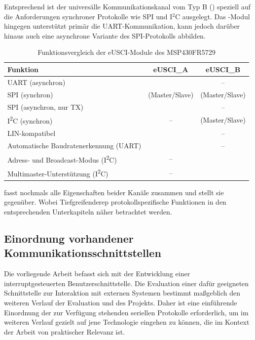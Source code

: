 \newpage
Entsprechend ist der univers\"alle Kommunikationskanal vom Typ B () speziell auf die Anforderungen synchroner Protokolle wie SPI und I$^{2}$C ausgelegt. Das -Modul hingegen unterst\"utzt prim\"ar die UART-Kommunikation, kann jedoch dar\"uber hinaus auch eine asynchrone Variante des SPI-Protokolls abbilden. 

\begin{table}[h!]
	\small
	\centering
	\begin{tabular}{|l|c|c|}
		\hline
		\textbf{Funktion} & \textbf{eUSCI\_A} & \textbf{eUSCI\_B} \\\hline
		UART (asynchron) & \checkmark & -- \\\hline
		SPI (synchron) & \checkmark (Master/Slave) & \checkmark (Master/Slave) \\\hline
		SPI (asynchron, nur TX) & \checkmark & -- \\\hline
		I\textsuperscript{2}C (synchron) & -- & \checkmark (Master/Slave) \\\hline
		LIN-kompatibel & \checkmark & -- \\\hline
		Automatische Baudratenerkennung (UART) & \checkmark & -- \\\hline
		Adress- und Broadcast-Modus (I\textsuperscript{2}C) & -- & \checkmark \\\hline
		Multimaster-Unterst\"utzung (I\textsuperscript{2}C) & -- & \checkmark \\\hline
	\end{tabular}
	\caption{Funktionsvergleich der eUSCI-Module des MSP430FR5729\\}
	\label{tab:eusci-vergleich}
\end{table}

 fasst nochmals alle Eigenschaften beider Kan\"ale zusammen und stellt sie gegen\"uber. Wobei Tiefgreifenderep protokollspezifische Funktionen in den entsprechenden Unterkapiteln n\"aher betrachtet werden.

\subsection{Einordnung vorhandener Kommunikationsschnittstellen}
\label{Einordnung_Schnittstellen}

Die vorliegende Arbeit befasst sich mit der Entwicklung einer interruptgesteuerten Benutzerschnittstelle. Die Evaluation einer daf\"ur geeigneten Schnittstelle zur Interaktion mit externen  Systemen bestimmt ma{\ss}geblich den weiteren Verlauf der Evaluation und des Projekts. Daher ist eine einf\"uhrende Einordnung der zur Verf\"ugung stehenden seriellen Protokolle erforderlich, um im weiteren Verlauf gezielt auf jene Technologie eingehen zu k\"onnen, die im Kontext der Arbeit von praktischer Relevanz ist.


